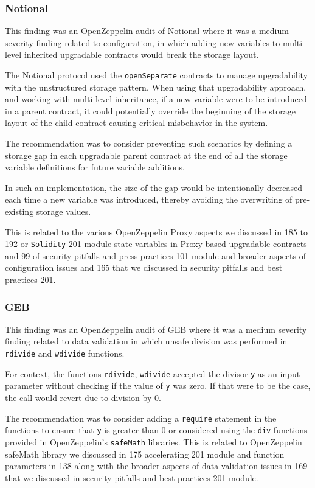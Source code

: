 \subsubsection{Notional}\label{notional}

This finding was an OpenZeppelin audit of Notional where it was a medium
severity finding related to configuration, in which adding new variables
to multi-level inherited upgradable contracts would break the storage
layout.

The Notional protocol used the \texttt{openSeparate} contracts to manage
upgradability with the unstructured storage pattern. When using that
upgradability approach, and working with multi-level inheritance, if a
new variable were to be introduced in a parent contract, it could
potentially override the beginning of the storage layout of the child
contract causing critical misbehavior in the system.

The recommendation was to consider preventing such scenarios by defining
a storage gap in each upgradable parent contract at the end of all the
storage variable definitions for future variable additions.

In such an implementation, the size of the gap would be intentionally
decreased each time a new variable was introduced, thereby avoiding the
overwriting of pre-existing storage values.

This is related to the various OpenZeppelin Proxy aspects we discussed
in 185 to 192 or \texttt{Solidity} 201 module state variables in
Proxy-based upgradable contracts and 99 of security pitfalls and press
practices 101 module and broader aspects of configuration issues and 165
that we discussed in security pitfalls and best practices 201.

\subsubsection{GEB}\label{geb}

This finding was an OpenZeppelin audit of GEB where it was a medium
severity finding related to data validation in which unsafe division was
performed in \texttt{rdivide} and \texttt{wdivide} functions.

For context, the functions \texttt{rdivide}, \texttt{wdivide} accepted
the divisor \texttt{y} as an input parameter without checking if the
value of \texttt{y} was zero. If that were to be the case, the call
would revert due to division by 0.

The recommendation was to consider adding a \texttt{require} statement
in the functions to ensure that \texttt{y} is greater than 0 or
considered using the \texttt{div} functions provided in OpenZeppelin's
\texttt{safeMath} libraries. This is related to OpenZeppelin safeMath
library we discussed in 175 accelerating 201 module and function
parameters in 138 along with the broader aspects of data validation
issues in 169 that we discussed in security pitfalls and best practices
201 module.

